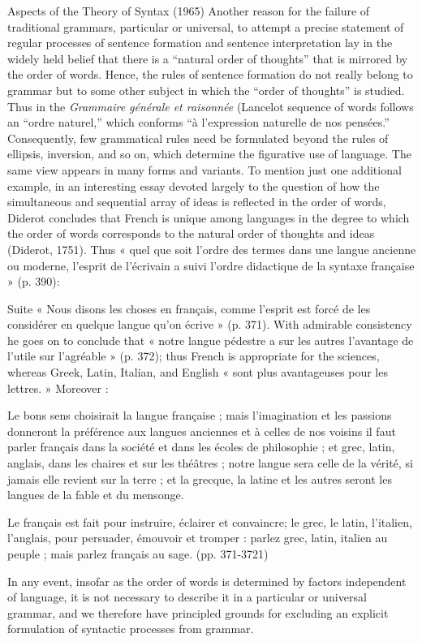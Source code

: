 \begin{keybox}[I]
\begin{lecture}{Aspects of the Theory of Syntax (1965)}
Another reason for the failure of traditional grammars, particular or universal, to attempt a precise statement of regular processes of sentence formation and sentence interpretation lay in the widely held belief that there is a “natural order of thoughts” that is mirrored by the order of words. Hence, the rules of sentence formation do not really belong to grammar but to some other subject in which the “order of thoughts” is studied. Thus in the \textit{Grammaire générale et raisonnée} (Lancelot sequence of words follows an “ordre naturel,” which conforms “à l’expression naturelle de nos pensées.” Consequently, few grammatical rules need be formulated beyond the rules of ellipsis, inversion, and so on, which determine the figurative use of language. The same view appears in many forms and variants. To mention just one additional example, in an interesting essay devoted largely to the question of how the simultaneous and sequential array of ideas is reflected in the order of words, Diderot concludes that French is unique among languages in the degree to which the order of words corresponds to the natural order of thoughts and ideas (Diderot, 1751). Thus « quel que soit l’ordre des termes dans une langue ancienne ou moderne, l’esprit de l’écrivain a suivi l’ordre didactique de la syntaxe française » (p. 390):
\end{lecture}
\begin{lecture}{Suite}
« Nous disons les choses en français, comme l’esprit est forcé de les considérer en quelque langue qu’on écrive » (p. 371). With admirable consistency he goes on to conclude that « notre langue pédestre a sur les autres l’avantage de l’utile sur l’agréable » (p. 372); thus French is appropriate for the sciences, whereas Greek, Latin, Italian, and English « sont plus avantageuses pour les lettres. » Moreover :

Le bons sens choisirait la langue française ; mais l’imagination et les passions donneront la préférence aux langues anciennes et à celles de nos voisins il faut parler français dans la société et dans les écoles de philosophie ; et grec, latin, anglais, dans les chaires et sur les théâtres ; notre langue sera celle de la vérité, si jamais elle revient sur la terre ; et la grecque, la latine et les autres seront les langues de la fable et du mensonge.

Le français est fait pour instruire, éclairer et convaincre; le grec, le latin, l’italien, l’anglais, pour persuader, émouvoir et tromper : parlez grec, latin, italien au peuple ; mais parlez français au sage. (pp. 371-3721)

In any event, insofar as the order of words is determined by factors independent of language, it is not necessary to describe it in a particular or universal grammar, and we therefore have principled grounds for excluding an explicit formulation of syntactic processes from grammar.
\end{lecture}
\end{keybox}

